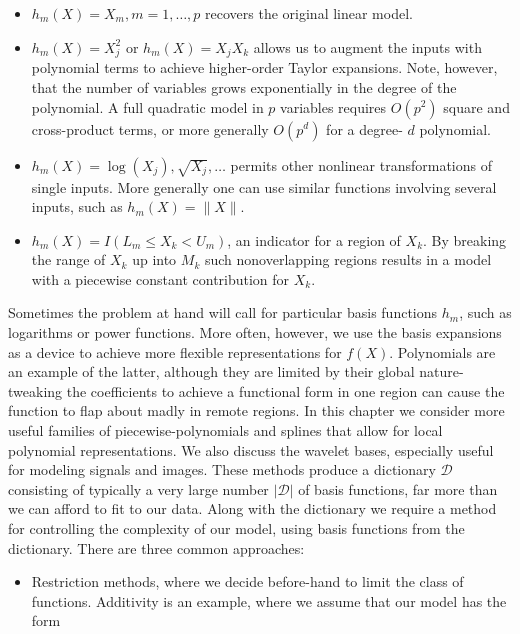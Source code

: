 \documentclass[10pt]{article}
\begin{document}
\begin{itemize}
  \item $h_{m}(X)=X_{m}, m=1, \ldots, p$ recovers the original linear model.
  \item $h_{m}(X)=X_{j}^{2}$ or $h_{m}(X)=X_{j} X_{k}$ allows us to augment the inputs with polynomial terms to achieve higher-order Taylor expansions. Note, however, that the number of variables grows exponentially in the degree of the polynomial. A full quadratic model in $p$ variables requires $O\left(p^{2}\right)$ square and cross-product terms, or more generally $O\left(p^{d}\right)$ for a degree- $d$ polynomial.
  \item $h_{m}(X)=\log \left(X_{j}\right), \sqrt{X_{j}}, \ldots$ permits other nonlinear transformations of single inputs. More generally one can use similar functions involving several inputs, such as $h_{m}(X)=\|X\|$.
  \item $h_{m}(X)=I\left(L_{m} \leq X_{k}<U_{m}\right)$, an indicator for a region of $X_{k}$. By breaking the range of $X_{k}$ up into $M_{k}$ such nonoverlapping regions results in a model with a piecewise constant contribution for $X_{k}$.
\end{itemize}

Sometimes the problem at hand will call for particular basis functions $h_{m}$, such as logarithms or power functions. More often, however, we use the basis expansions as a device to achieve more flexible representations for $f(X)$. Polynomials are an example of the latter, although they are limited by their global nature-tweaking the coefficients to achieve a functional form in one region can cause the function to flap about madly in remote regions. In this chapter we consider more useful families of piecewise-polynomials and splines that allow for local polynomial representations. We also discuss the wavelet bases, especially useful for modeling signals and images. These methods produce a dictionary $\mathcal{D}$ consisting of typically a very large number $|\mathcal{D}|$ of basis functions, far more than we can afford to fit to our data. Along with the dictionary we require a method for controlling the complexity of our model, using basis functions from the dictionary. There are three common approaches:

\begin{itemize}
  \item Restriction methods, where we decide before-hand to limit the class of functions. Additivity is an example, where we assume that our model has the form
\end{itemize}
\end{document}
